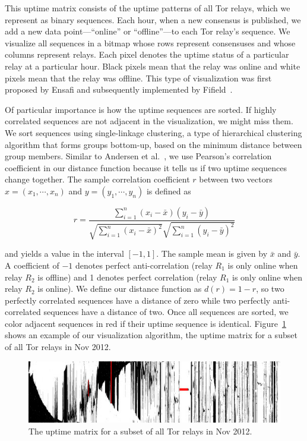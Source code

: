 This uptime matrix consists of the uptime patterns of all Tor relays, which we
represent as binary sequences.  Each hour, when a new consensus is published, we
add a new data point---``online'' or ``offline''---to each Tor relay's sequence.
We visualize all sequences in a bitmap whose rows represent consensuses and
whose columns represent relays.  Each pixel denotes the uptime status of a
particular relay at a particular hour.  Black pixels mean that the relay was
online and white pixels mean that the relay was offline.  This type of
visualization was first proposed by Ensafi and subsequently implemented by
Fifield~\cite{Fifield2014a}.

Of particular importance is how the uptime sequences are sorted.  If highly
correlated sequences are not adjacent in the visualization, we might miss them.
We sort sequences using single-linkage clustering, a type of hierarchical
clustering algorithm that forms groups bottom-up, based on the minimum distance
between group members.  Similar to Andersen et al.~\cite{Andersen2002a}, we use
Pearson's correlation coefficient in our distance function because it tells us
if two uptime sequences change together.  The sample correlation coefficient $r$
between two vectors $x = (x_1, \cdots, x_n)$ and $y = (y_1, \cdots, y_n)$ is
defined as

\begin{equation}
r = \frac{\sum_{i=1}^{n} (x_{i} - \bar{x}) (y_{i} - \bar{y})}
{\sqrt{\sum_{i=1}^{n} (x_{i} - \bar{x})^2} \sqrt{\sum_{i=1}^{n} (y_{i} - \bar{y})^2}}
\end{equation}

and yields a value in the interval $[-1, 1]$.  The sample mean is given by
$\bar{x}$ and $\bar{y}$.  A coefficient of $-1$ denotes perfect anti-correlation
(relay $R_1$ is only online when relay $R_2$ is offline) and 1 denotes perfect
correlation (relay $R_1$ is only online when relay $R_2$ is online).  We define
our distance function as $d(r) = 1 - r$, so two perfectly correlated sequences
have a distance of zero while two perfectly anti-correlated sequences have a
distance of two.  Once all sequences are sorted, we color adjacent sequences in
red if their uptime sequence is identical.  Figure~\ref{fig:uptime-matrix} shows
an example of our visualization algorithm, the uptime matrix for a subset of all
Tor relays in Nov 2012.

\begin{figure}[t]
	\centering
	\includegraphics[width=\linewidth]{diagrams/2012-11.jpg}
	\caption{The uptime matrix for a subset of all Tor relays in Nov 2012.}
	\label{fig:uptime-matrix}
\end{figure}

